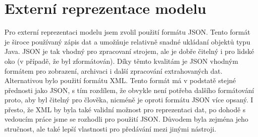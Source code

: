 		\section{Externí reprezentace modelu}
			Pro externí reprezentaci modelu jsem zvolil použití formátu JSON. Tento formát je široce používaný zápis dat a umožňuje relativně snadné ukládaní objektů typu Java. JSON je tak vhodný pro zpracovaní strojem, ale je dobře čitelný i pro lidské oko (v případě, že byl zformátován). Díky těmto kvalitám je JSON vhodným formátem pro zobrazení, archivaci i další zpracování extrahovaných dat.\\
			
			Alternativou bylo použití formátu XML. Tento formát má v podstatě stejné přednosti jako JSON, s tím rozdílem, že obvykle není potřeba dalšího formátování proto, aby byl čitelný pro člověka, nicméně je oproti formátu JSON více opsaný. I přesto, že XML by byla také validní možnost pro reprezentaci dat, po dohodě s vedoucím práce jsme se rozhodli pro použití JSON. Důvodem byla zejména jeho stručnost, ale také lepší vlastnosti pro předávání mezi jinými nástroji.
